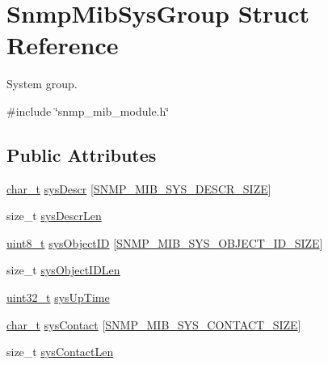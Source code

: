 \hypertarget{structSnmpMibSysGroup}{}\section{Snmp\+Mib\+Sys\+Group Struct Reference}
\label{structSnmpMibSysGroup}


System group.  




{\ttfamily \#include \char`\"{}snmp\+\_\+mib\+\_\+module.\+h\char`\"{}}

\subsection*{Public Attributes}
\begin{DoxyCompactItemize}
\item 
\hyperlink{compiler__port_8h_a40bb5262bf908c328fbcfbe5d29d0201}{char\+\_\+t} \hyperlink{structSnmpMibSysGroup_a82d86d662449adef2ed4f3b8145ccbbb}{sys\+Descr} \mbox{[}\hyperlink{snmp__mib__module_8h_aab7d2569c9f29cb9937e0126db04d99c}{S\+N\+M\+P\+\_\+\+M\+I\+B\+\_\+\+S\+Y\+S\+\_\+\+D\+E\+S\+C\+R\+\_\+\+S\+I\+ZE}\mbox{]}
\item 
size\+\_\+t \hyperlink{structSnmpMibSysGroup_a16bfb0ddb6ebdc3c95c5d131aabb9f5d}{sys\+Descr\+Len}
\item 
\hyperlink{stdint_8h_aba7bc1797add20fe3efdf37ced1182c5}{uint8\+\_\+t} \hyperlink{structSnmpMibSysGroup_a460030960888bccb621a624751433267}{sys\+Object\+ID} \mbox{[}\hyperlink{snmp__mib__module_8h_a406a2884e336e38cb854e6feb30c26cb}{S\+N\+M\+P\+\_\+\+M\+I\+B\+\_\+\+S\+Y\+S\+\_\+\+O\+B\+J\+E\+C\+T\+\_\+\+I\+D\+\_\+\+S\+I\+ZE}\mbox{]}
\item 
size\+\_\+t \hyperlink{structSnmpMibSysGroup_a4885a62790e09368b616ee6bc88a74bd}{sys\+Object\+I\+D\+Len}
\item 
\hyperlink{stdint_8h_a435d1572bf3f880d55459d9805097f62}{uint32\+\_\+t} \hyperlink{structSnmpMibSysGroup_a737408e6c21f6310c08887f9ed98e2d0}{sys\+Up\+Time}
\item 
\hyperlink{compiler__port_8h_a40bb5262bf908c328fbcfbe5d29d0201}{char\+\_\+t} \hyperlink{structSnmpMibSysGroup_a343ab7098661b03252065d004a2005bd}{sys\+Contact} \mbox{[}\hyperlink{snmp__mib__module_8h_ae4f3bcd222e59a69d4289a8d7c353714}{S\+N\+M\+P\+\_\+\+M\+I\+B\+\_\+\+S\+Y\+S\+\_\+\+C\+O\+N\+T\+A\+C\+T\+\_\+\+S\+I\+ZE}\mbox{]}
\item 
size\+\_\+t \hyperlink{structSnmpMibSysGroup_a9ebaca173ab097ec6209432d820f53b5}{sys\+Contact\+Len}

\end{DoxyCompactItemize}
